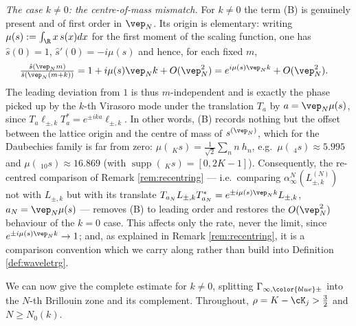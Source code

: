 \documentclass[a4paper, 11pt]{article}
\DeclareMathOperator{\1}{\mathds{1}}
\DeclareMathOperator{\supp}{supp}
\begin{document}
\medskip

\noindent\emph{The case $k\neq0$: the centre-of-mass mismatch.} For $k\neq0$ the term (B) is genuinely present and of first order in $\vep_{N}$. Its origin is elementary: writing $\mu(s):=\int_{\R}x\!\ s(x)dx$ for the first moment of the scaling function, one has $\hat{s}(0)=1$, $\hat{s}'(0)=-i\mu(s)$ and hence, for each fixed $m$,
\begin{align}
\label{eq:comphase}
\tfrac{\hat{s}(\vep_{N}m)}{\hat{s}(\vep_{N}(m+k))} & = 1+i\mu(s)\vep_{N}k+O(\vep_{N}^{2}) = e^{i\mu(s)\vep_{N}k}+O(\vep_{N}^{2}).
\end{align}
The leading deviation from $1$ is thus $m$-independent and is exactly the phase picked up by the $k$-th Virasoro mode under the translation $T_{a}$ by $a=\vep_{N}\mu(s)$, since $T_{a}\ell_{\pm,k}T_{a}^{*}=e^{\pm ika}\ell_{\pm,k}$. In other words, (B) records nothing but the offset between the lattice origin and the centre of mass of $s^{(\vep_{N})}$, which for the Daubechies family is far from zero: $\mu(\!\ _{K}s)=\tfrac{1}{\sqrt{2}}\sum_{n}n\!\ h_{n}$, e.g.~$\mu(\!\ _{4}s)\approx5.995$ and $\mu(\!\ _{10}s)\approx16.869$ (with $\supp(\!\ _{K}s)=[0,2K-1]$). Consequently, the re-centred comparison of Remark \ref{rem:recentring} --- i.e.~comparing $\alpha^{N}_{\infty}(L^{(N)}_{\pm,k})$ not with $L_{\pm,k}$ but with its translate $T_{a_{N}}L_{\pm,k}T_{a_{N}}^{*} = e^{\pm i\mu(s)\vep_{N}k}L_{\pm,k}$, $a_{N}=\vep_{N}\mu(s)$ --- removes (B) to leading order and restores the $O(\vep_{N}^{2})$ behaviour of the $k=0$ case. This affects only the rate, never the limit, since $e^{\pm i\mu(s)\vep_{N}k}\rightarrow1$; and, as explained in Remark \ref{rem:recentring}, it is a comparison convention which we carry along rather than build into Definition \ref{def:waveletrg}.

We can now give the complete estimate for $k\neq0$, splitting $\Gamma_{\infty,{\color{blue}\pm}}$ into the $N$-th Brillouin zone and its complement. Throughout, $\rho=K-\cK_{j}>\tfrac{3}{2}$ and $N\geq N_{0}(k)$.
\end{document}
